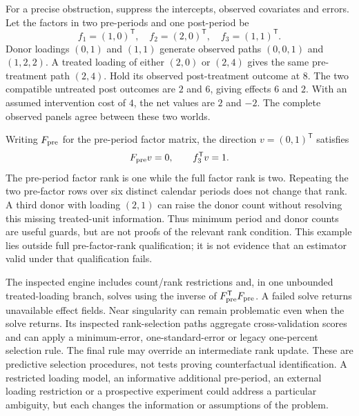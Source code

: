 For a precise obstruction, suppress the intercepts, observed covariates and
errors. Let the factors in two pre-periods and one post-period be
\begin{equation}
\label{exec21:gsynth-witness}
 f_1=(1,0)^{\mathsf T},\quad f_2=(2,0)^{\mathsf T},\quad
 f_3=(1,1)^{\mathsf T}.
\end{equation}
Donor loadings $(0,1)$ and $(1,1)$ generate observed paths $(0,0,1)$ and
$(1,2,2)$. A treated loading of either $(2,0)$ or $(2,4)$ gives the same
pre-treatment path $(2,4)$. Hold its observed post-treatment outcome at $8$.
The two compatible untreated post outcomes are $2$ and $6$, giving effects
$6$ and $2$. With an assumed intervention cost of $4$, the net values are $2$
and $-2$. The complete observed panels agree between these two worlds.
\citep{exec21_gsynth_reference}

Writing $F_{\rm pre}$ for the pre-period factor matrix, the direction
$v=(0,1)^{\mathsf T}$ satisfies
\begin{equation}
\label{exec21:gsynth-null}
 F_{\rm pre}v=0,\qquad f_3^{\mathsf T}v=1.
\end{equation}
The pre-period factor rank is one while the full factor rank is two.
Repeating the two pre-factor rows over six distinct calendar periods does
not change that rank. A third donor with loading $(2,1)$ can raise the donor
count without resolving this missing treated-unit information. Thus minimum
period and donor counts are useful guards, but are not proofs of the relevant
rank condition. This example lies outside full pre-factor-rank qualification;
it is not evidence that an estimator valid under that qualification fails.
\citep{exec21_gsynth_reference}

The inspected engine includes count/rank restrictions and, in one unbounded
treated-loading branch, solves using the inverse of
$F_{\rm pre}^{\mathsf T}F_{\rm pre}$. A failed solve returns unavailable
effect fields. Near singularity can remain problematic even when the solve
returns. Its inspected rank-selection paths aggregate cross-validation
scores and can apply a minimum-error, one-standard-error or legacy
one-percent selection rule. The final rule may override an intermediate
rank update. These are predictive selection procedures, not tests proving
counterfactual identification. A restricted loading model, an informative
additional pre-period, an external loading restriction or a prospective
experiment could address a particular ambiguity, but each changes the
information or assumptions of the problem. \citep{exec21_gsynth_engine}

